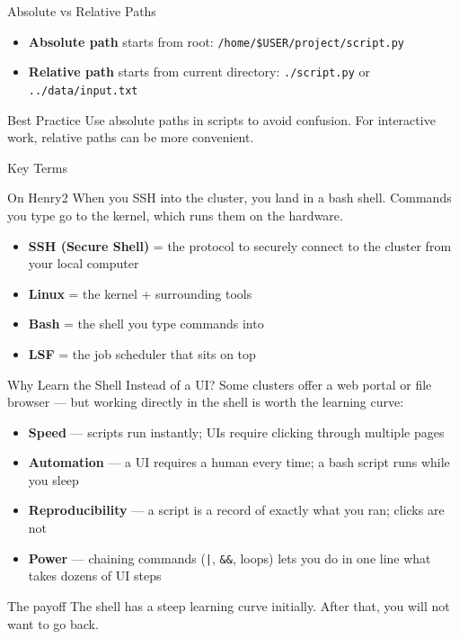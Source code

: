 \documentclass[aspectratio=169, 11pt]{beamer}
\begin{document}
\begin{frame}{Absolute vs Relative Paths}
  \begin{itemize}
    \item \textbf{Absolute path} starts from root: \texttt{/home/\$USER/project/script.py}
    \item \textbf{Relative path} starts from current directory: \texttt{./script.py} or \texttt{../data/input.txt}
  \end{itemize}
  \vspace{0.5em}
  \begin{block}{Best Practice}
    Use absolute paths in scripts to avoid confusion.
    For interactive work, relative paths can be more convenient.
  \end{block}
\end{frame}



\begin{frame}{Key Terms}
  \begin{block}{On Henry2}
    When you SSH into the cluster, you land in a bash shell.
    Commands you type go to the kernel, which runs them on the hardware.
  \end{block}
  \vspace{0.5em}
  \begin{itemize}
    \item \textbf{SSH (Secure Shell)} = the protocol to securely connect to the cluster from your local computer
    \item \textbf{Linux} = the kernel + surrounding tools
    \item \textbf{Bash} = the shell you type commands into
    \item \textbf{LSF} = the job scheduler that sits on top
  \end{itemize}
\end{frame}

\begin{frame}{Why Learn the Shell Instead of a UI?}
  Some clusters offer a web portal or file browser --- but working directly in the shell is worth the learning curve:
  \vspace{-0.1em}
  \begin{itemize}
    \item \textbf{Speed} --- scripts run instantly; UIs require clicking through multiple pages
    \item \textbf{Automation} --- a UI requires a human every time; a bash script runs while you sleep
    \item \textbf{Reproducibility} --- a script is a record of exactly what you ran; clicks are not
    \item \textbf{Power} --- chaining commands (\texttt{|}, \texttt{\&\&}, loops) lets you do in one line what takes dozens of UI steps
  \end{itemize}
  \vspace{-0.1em}
  \begin{block}{The payoff}
    The shell has a steep learning curve initially. After that, you will not want to go back.
  \end{block}
\end{frame}
\end{document}
